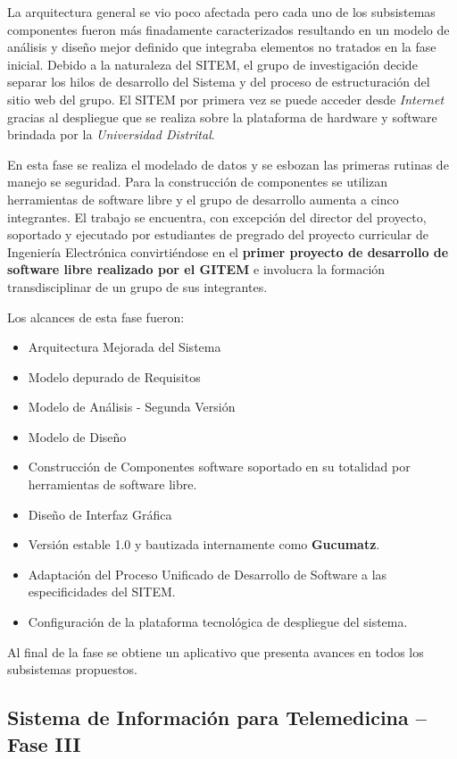 La arquitectura general se vio poco afectada pero cada uno de los subsistemas componentes fueron más finadamente caracterizados resultando en un modelo de análisis y diseño mejor definido que integraba elementos no tratados en la fase inicial. Debido a la naturaleza del SITEM, el grupo de investigación decide separar los hilos de desarrollo del Sistema y del proceso de estructuración del sitio web del grupo. El SITEM por primera vez se puede acceder desde \textit{Internet} gracias al despliegue que se realiza sobre la plataforma de hardware y software brindada por la \textit{Universidad Distrital}. 

En esta fase se realiza el modelado de datos y se esbozan las primeras rutinas de manejo se seguridad. Para la construcción de componentes se utilizan herramientas de software libre y el grupo de desarrollo aumenta a cinco integrantes. El trabajo se encuentra, con excepción del director del proyecto, soportado y ejecutado por estudiantes de pregrado del proyecto curricular de Ingeniería Electrónica convirtiéndose en el \textbf{primer proyecto de desarrollo de software libre realizado por el GITEM} e involucra la formación transdisciplinar de un grupo de sus integrantes.

Los alcances de esta fase fueron:
\begin{itemize}
\item Arquitectura Mejorada del Sistema
\item Modelo depurado de Requisitos
\item Modelo de Análisis - Segunda Versión
\item Modelo de Diseño
\item Construcción de Componentes software soportado en su totalidad por herramientas de software libre.
\item Diseño de Interfaz Gráfica
\item Versión estable 1.0 y bautizada internamente como \textbf{Gucumatz}.
\item Adaptación del Proceso Unificado de Desarrollo de Software a las especificidades del SITEM.
\item Configuración de la plataforma tecnológica de despliegue del sistema.                                            \end{itemize}

Al final de la fase se obtiene un aplicativo que presenta avances en todos los subsistemas propuestos.


\subsection{Sistema de Información para Telemedicina – Fase III}

